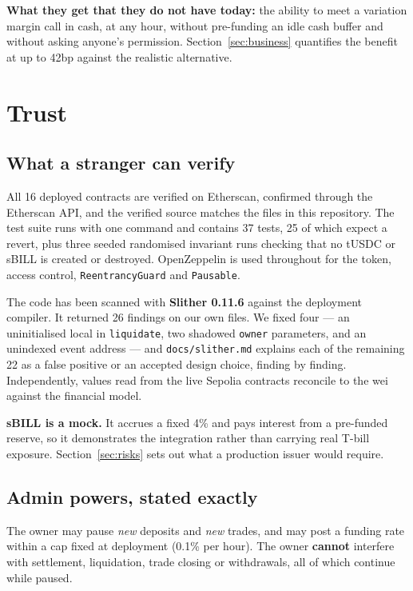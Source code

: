 \documentclass[11pt,a4paper]{article}
\begin{document}
\textbf{What they get that they do not have today:} the ability to meet a variation margin call in
cash, at any hour, without pre-funding an idle cash buffer and without asking anyone's permission.
Section~\ref{sec:business} quantifies the benefit at up to 42bp against the realistic alternative.

\section{Trust}

\subsection{What a stranger can verify}

All 16 deployed contracts are verified on Etherscan, confirmed through the Etherscan API, and the
verified source matches the files in this repository. The test suite runs with one command and
contains 37 tests, 25 of which expect a revert, plus three seeded randomised invariant runs checking that no tUSDC or
sBILL is created or destroyed. OpenZeppelin is used throughout for the token, access control,
\texttt{ReentrancyGuard} and \texttt{Pausable}.

The code has been scanned with \textbf{Slither 0.11.6} against the deployment compiler. It returned
26 findings on our own files. We fixed four — an uninitialised local in \texttt{liquidate}, two
shadowed \texttt{owner} parameters, and an unindexed event address — and \texttt{docs/slither.md}
explains each of the remaining 22 as a false positive or an accepted design choice, finding by
finding. Independently, \reconCount{} values read from the live Sepolia contracts reconcile to the wei against
the financial model.

\textbf{sBILL is a mock.} It accrues a fixed 4\% and pays interest from a pre-funded reserve, so it demonstrates the integration rather than carrying real T-bill exposure. Section~\ref{sec:risks} sets out what a production issuer would require.

\subsection{Admin powers, stated exactly}

The owner may pause \emph{new} deposits and \emph{new} trades, and may post a funding rate within a
cap fixed at deployment (0.1\% per hour). The owner \textbf{cannot} interfere with settlement,
liquidation, trade closing or withdrawals, all of which continue while paused.
\end{document}

